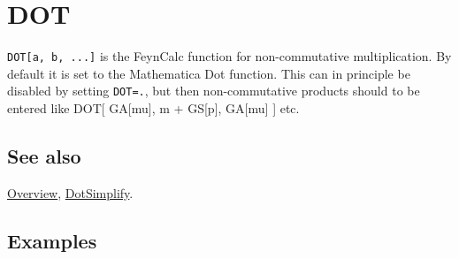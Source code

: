 \documentclass[../FeynCalcManual.tex]{subfiles}
\begin{document}
\hypertarget{dot}{
\section{DOT}\label{dot}}

\texttt{DOT[\allowbreak{}a,\ \allowbreak{}b,\ \allowbreak{}...]} is the
FeynCalc function for non-commutative multiplication. By default it is
set to the Mathematica Dot function. This can in principle be disabled
by setting \texttt{DOT=.}, but then non-commutative products should to
be entered like DOT{[} GA{[}mu{]}, m + GS{[}p{]}, GA{[}mu{]} {]} etc.

\subsection{See also}

\hyperlink{toc}{Overview}, \hyperlink{dotsimplify}{DotSimplify}.

\subsection{Examples}
\end{document}
